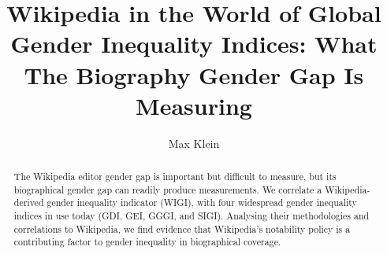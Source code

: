 \documentclass{sig-alternate}
\begin{document}
%

\title{Wikipedia in the World of Global Gender Inequality Indices: What The Biography Gender Gap Is Measuring}
%
%
%
%
%

%
\author{
%
%
\alignauthor
Max Klein
       }

\maketitle
\begin{abstract}
The Wikipedia editor gender gap is important but difficult to measure, but its biographical gender gap can readily produce measurements.
We correlate a Wikipedia-derived gender inequality indicator (WIGI), with four widespread gender inequality indices in use today (GDI, GEI, GGGI, and SIGI). Analysing their methodologies and correlations to Wikipedia, we find evidence that Wikipedia's notability policy is a contributing factor to gender inequality in biographical coverage.
\end{abstract}
\end{document}
